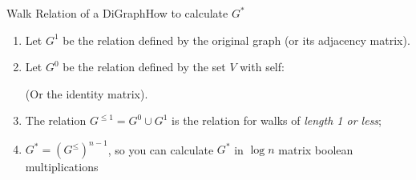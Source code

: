 \begin{frame}{Walk Relation of a DiGraph}{How to calculate $G^*$}

  \begin{enumerate}
  \item Let $G^1$ be the relation defined by the original graph (or its adjacency matrix).\medskip

  \item Let $G^0$ be the relation defined by the set $V$ with self:
     (Or the identity matrix).\medskip

  \item The relation $G^{\leq 1} = G^0 \cup G^1$ is the relation for walks of \emph{length 1 or less};\medskip

  \item $G^* = (G^{\leq})^{n-1}$, so you can calculate $G^*$ in $\log n$ matrix boolean multiplications
  \end{enumerate}
\end{frame}

